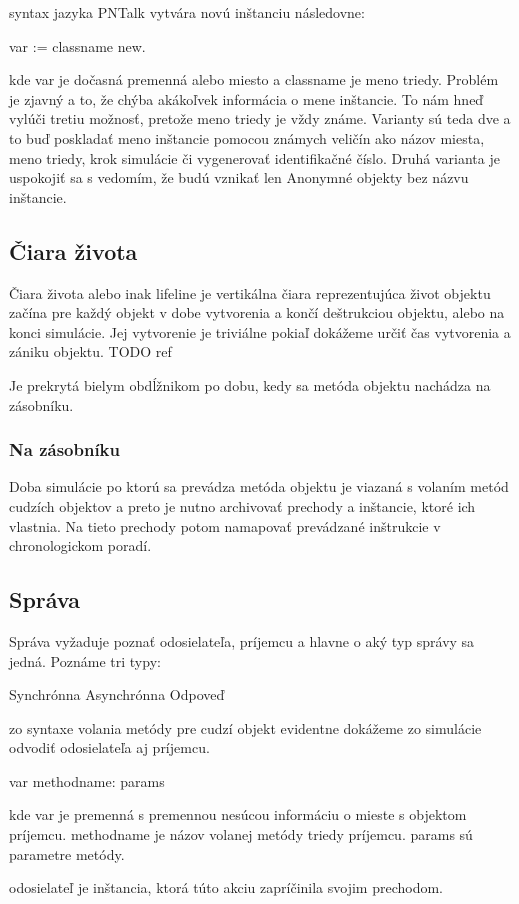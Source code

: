 syntax jazyka PNTalk vytvára novú inštanciu následovne:

var := classname new.

kde var je dočasná premenná alebo miesto a classname je meno triedy. Problém je zjavný a to, že chýba akákoľvek informácia o mene inštancie. To nám hneď vylúči tretiu možnosť, pretože meno triedy je vždy známe. Varianty sú teda dve a to buď poskladať meno inštancie pomocou známych veličín ako názov miesta, meno triedy, krok simulácie či vygenerovať identifikačné číslo. Druhá varianta je uspokojiť sa s vedomím, že budú vznikať len Anonymné objekty bez názvu inštancie.

\subsection*{Čiara života}
Čiara života alebo inak lifeline je vertikálna čiara reprezentujúca život objektu začína pre každý objekt v dobe vytvorenia a končí deštrukciou objektu, alebo na konci simulácie. Jej vytvorenie je triviálne pokiaľ dokážeme určiť čas vytvorenia a zániku objektu. TODO ref

Je prekrytá bielym obdĺžnikom po dobu, kedy sa metóda objektu nachádza na zásobníku.

\subsubsection*{Na zásobníku}
Doba simulácie po ktorú sa prevádza metóda objektu je viazaná s volaním metód cudzích objektov a preto je nutno archivovať prechody a inštancie, ktoré ich vlastnia. Na tieto prechody potom namapovať prevádzané inštrukcie v chronologickom poradí.

\subsection*{Správa}
Správa vyžaduje poznať odosielateľa, príjemcu a hlavne o aký typ správy sa jedná. Poznáme tri typy:

Synchrónna
Asynchrónna
Odpoveď

zo syntaxe volania metódy pre cudzí objekt evidentne dokážeme zo simulácie odvodiť odosielateľa aj príjemcu.

var methodname: params

kde var je premenná s premennou nesúcou informáciu o mieste s objektom príjemcu. methodname je názov volanej metódy triedy príjemcu. params sú parametre metódy.

odosielateľ je inštancia, ktorá túto akciu zapríčinila svojim prechodom.

